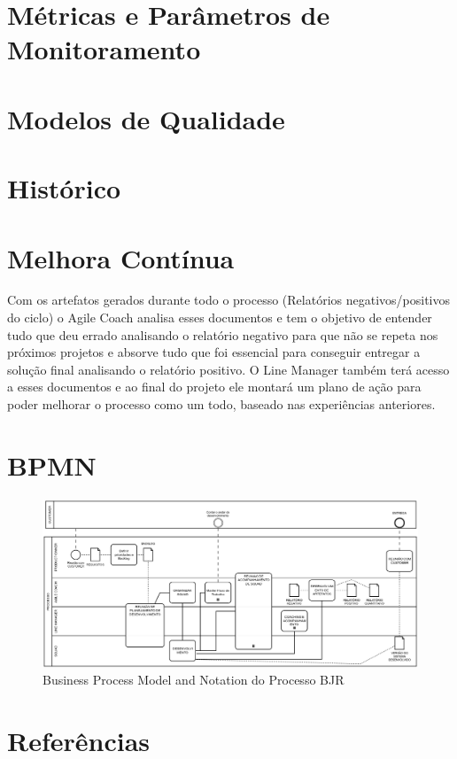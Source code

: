 \documentclass[	DIV=calc,%
							paper=a4,%
							fontsize=12pt,%
							onecolumn]{scrartcl}	 					%
\begin{document}
\section{Métricas e Parâmetros de Monitoramento}



\section{Modelos de Qualidade}

\section{Histórico}


\section{Melhora Contínua}
Com os artefatos gerados durante todo o processo (Relatórios negativos/positivos do ciclo) o Agile Coach analisa esses documentos e tem o objetivo de entender tudo que deu errado analisando o relatório negativo para que não se repeta nos próximos projetos e absorve tudo que foi essencial para conseguir entregar a solução final analisando o relatório positivo. O Line Manager também terá acesso a esses documentos e ao final do projeto ele montará um plano de ação para poder melhorar o processo como um todo, baseado nas experiências anteriores.


\section{BPMN}
\begin{figure}[!htb]
	\centering
	\includegraphics[width=\textwidth]{bpmn}
	\caption{Business Process Model and Notation do Processo BJR}
	\label{bpmn}
\end{figure}

\clearpage
\section{Referências}
\begingroup
\renewcommand{\section}[2]{}


 
\endgroup
\end{document}
